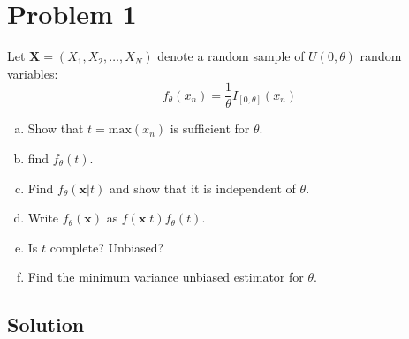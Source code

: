 \documentclass[a4paper]{article}
\begin{document}
\section*{Problem 1}%
Let $\bm{X} = (X_1, X_2, \dots, X_N)$ denote a random sample of $U(0, \theta)$ random variables:
\[
  f_{\theta}(x_n) = \frac{1}{\theta} I_{[0,\theta]}(x_n)
\]

\begin{enumerate}[a.]
  \item Show that $t = \text{max}(x_n)$ is sufficient for $\theta$.
  \item find $f_{\theta}(t)$.
  \item Find $f_{\theta}(\bm{x}|t)$ and show that it is independent of $\theta$.
  \item Write $f_{\theta}(\bm{x})$ as $f(\bm{x}|t)f_{\theta}(t)$.
  \item Is $t$ complete? Unbiased?
  \item Find the minimum variance unbiased estimator for $\theta$.
\end{enumerate}

\subsection*{Solution}%
\end{document}
